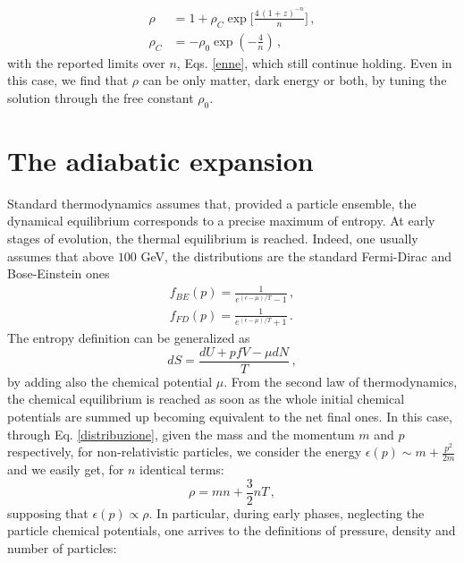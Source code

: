 \documentclass[nofootinbib,prd,superscriptaddress,showpacs,showkeys,]{revtex4}
\begin{document}
\begin{subequations}\label{soluzu2}
\begin{align}
\rho&= 1 + \rho_C\exp{\Big[\frac{4\,(1+z)^{-n}}{n}\Big]}\,,\\
\rho_C&=-\rho_0\exp{\left(-\frac{4}{n}\right)}\,,
\end{align}
\end{subequations}
with the reported limits over $n$, Eqs. \eqref{enne}, which still continue holding. Even in this case, we find that $\rho$ can be only matter, dark energy or both, by tuning the solution through the free constant $\rho_0$.

















\section{The  adiabatic expansion }

Standard thermodynamics assumes that, provided a particle ensemble, the dynamical equilibrium corresponds to a precise maximum of entropy. At early stages of  evolution, the thermal equilibrium is reached. Indeed, one usually assumes that above $100$ GeV, the  distributions are  the standard Fermi-Dirac and Bose-Einstein ones
\begin{subequations}\label{distribuzione}
\begin{align}
f_{BE}(p)=\frac{1}{e^{(\epsilon-\mu)/T}-1}\,,\\
f_{FD}(p)=\frac{1}{e^{(\epsilon-\mu)/T}+1}\,.
\end{align}
\end{subequations}
The entropy definition can be generalized as
\begin{equation}\label{entrgen}
dS=\frac{dU+pfV-\mu dN}{T}\,,
\end{equation}
by adding also the chemical potential $\mu$. From the second law of thermodynamics, the chemical equilibrium is reached as soon as the whole initial chemical potentials are summed up becoming equivalent to the net final ones. In this case, through Eq. \eqref{distribuzione}, given the mass and the momentum $m$ and $p$ respectively, for non-relativistic particles, we consider the energy $\epsilon(p)\sim m+\frac{p^2}{2m}$ and we easily get, for $n$ identical terms:
\begin{equation}\label{rhoux}
\rho=mn+\frac{3}{2}nT\,,
\end{equation}
supposing that $\epsilon(p)\propto \rho$. In particular, during early phases, neglecting the particle chemical potentials, one arrives to the definitions of pressure, density and number of particles:
\end{document}

